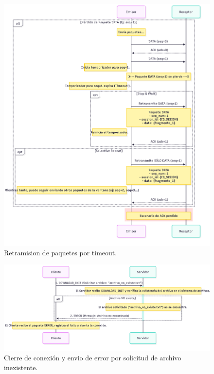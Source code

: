 \begin{figure}[H]
    \centering
    \includegraphics[width=1\linewidth]{images/RETRANSMISION}
    \caption{Retramision de paquetes por timeout.}
    \label{fig:retransmision}
\end{figure}

\begin{figure}[H]
    \centering
    \includegraphics[width=1\linewidth]{images/diagram_sec_unexistent_file.png}
    \caption{Cierre de conexión y envio de error por solicitud de archivo inexistente.}
    \label{fig:unexistent_file_error}
\end{figure}

